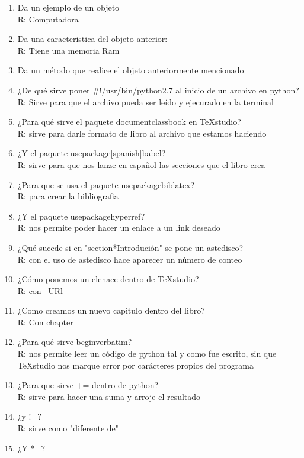 \documentclass[letterpaper, 12pt, oneside]{article}%
\begin{document}
\begin{enumerate}
	\item Da un ejemplo de un objeto\\
R: Computadora
	\item Da una caracteristica del objeto anterior:\\
R: Tiene una memoria Ram
	\item Da un método que realice el objeto anteriormente mencionado \\
	\item ¿De qué sirve poner \#!/usr/bin/python2.7 al inicio de un archivo en python?\\
R: Sirve para que el archivo pueda ser leído y ejecurado en la terminal
\item ¿Para qué sirve el paquete documentclass{book} en TeXstudio?\\
R: sirve para darle formato de libro al archivo que estamos haciendo
\item ¿Y el paquete usepackage[spanish]{babel}?\\
R: sirve para que nos lanze en español las secciones que el libro crea
\item ¿Para que se usa el paquete usepackage{biblatex}?\\
R: para crear la bibliografia
\item ¿Y el paquete usepackage{hyperref}?\\
R: nos permite poder hacer un enlace a un link deseado
	\item ¿Qué sucede si en "section*{Introdución}" se pone un astedisco?\\
R: con el uso de astedisco hace aparecer un número de conteo
\item  ¿Cómo ponemos un elenace dentro de TeXstudio?\\
R: con \ URl
\item ¿Como creamos un nuevo capitulo dentro del libro?\\ 
R: Con chapter
\item ¿Para qué sirve begin{verbatim}?\\
R: nos permite leer un código de python tal y como fue escrito, sin que TeXstudio nos marque error por carácteres propios del programa
\item ¿Para que sirve += dentro de python?\\
R: sirve para hacer una suma y arroje el resultado
\item ¿y !=?\\
R: sirve como "diferente de"
\item ¿Y *=?\\

\end{enumerate}
\end{document}
